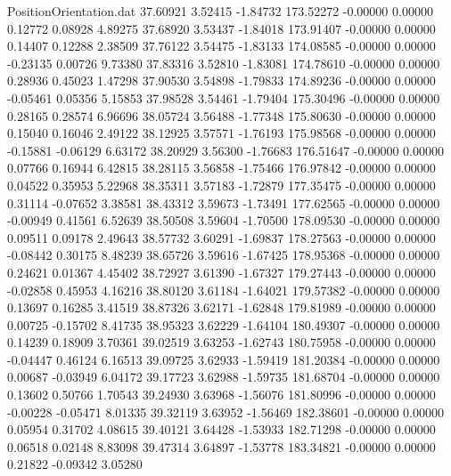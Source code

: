 \begin{filecontents}{PositionOrientation.dat}
  37.60921    3.52415   -1.84732   173.52272   -0.00000    0.00000    0.12772    0.08928    4.89275
  37.68920    3.53437   -1.84018   173.91407   -0.00000    0.00000    0.14407    0.12288    2.38509
  37.76122    3.54475   -1.83133   174.08585   -0.00000    0.00000   -0.23135    0.00726    9.73380
  37.83316    3.52810   -1.83081   174.78610   -0.00000    0.00000    0.28936    0.45023    1.47298
  37.90530    3.54898   -1.79833   174.89236   -0.00000    0.00000   -0.05461    0.05356    5.15853
  37.98528    3.54461   -1.79404   175.30496   -0.00000    0.00000    0.28165    0.28574    6.96696
  38.05724    3.56488   -1.77348   175.80630   -0.00000    0.00000    0.15040    0.16046    2.49122
  38.12925    3.57571   -1.76193   175.98568   -0.00000    0.00000   -0.15881   -0.06129    6.63172
  38.20929    3.56300   -1.76683   176.51647   -0.00000    0.00000    0.07766    0.16944    6.42815
  38.28115    3.56858   -1.75466   176.97842   -0.00000    0.00000    0.04522    0.35953    5.22968
  38.35311    3.57183   -1.72879   177.35475   -0.00000    0.00000    0.31114   -0.07652    3.38581
  38.43312    3.59673   -1.73491   177.62565   -0.00000    0.00000   -0.00949    0.41561    6.52639
  38.50508    3.59604   -1.70500   178.09530   -0.00000    0.00000    0.09511    0.09178    2.49643
  38.57732    3.60291   -1.69837   178.27563   -0.00000    0.00000   -0.08442    0.30175    8.48239
  38.65726    3.59616   -1.67425   178.95368   -0.00000    0.00000    0.24621    0.01367    4.45402
  38.72927    3.61390   -1.67327   179.27443   -0.00000    0.00000   -0.02858    0.45953    4.16216
  38.80120    3.61184   -1.64021   179.57382   -0.00000    0.00000    0.13697    0.16285    3.41519
  38.87326    3.62171   -1.62848   179.81989   -0.00000    0.00000    0.00725   -0.15702    8.41735
  38.95323    3.62229   -1.64104   180.49307   -0.00000    0.00000    0.14239    0.18909    3.70361
  39.02519    3.63253   -1.62743   180.75958   -0.00000    0.00000   -0.04447    0.46124    6.16513
  39.09725    3.62933   -1.59419   181.20384   -0.00000    0.00000    0.00687   -0.03949    6.04172
  39.17723    3.62988   -1.59735   181.68704   -0.00000    0.00000    0.13602    0.50766    1.70543
  39.24930    3.63968   -1.56076   181.80996   -0.00000    0.00000   -0.00228   -0.05471    8.01335
  39.32119    3.63952   -1.56469   182.38601   -0.00000    0.00000    0.05954    0.31702    4.08615
  39.40121    3.64428   -1.53933   182.71298   -0.00000    0.00000    0.06518    0.02148    8.83098
  39.47314    3.64897   -1.53778   183.34821   -0.00000    0.00000    0.21822   -0.09342    3.05280

\end{filecontents}
